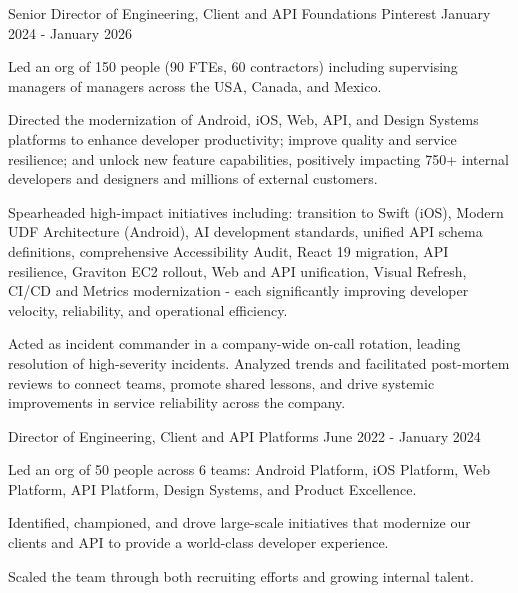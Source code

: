 \begin{cventries}
  \cventry
    {Senior Director of Engineering, Client and API Foundations} %
    {Pinterest} %
    {} %
    {January 2024 - January 2026} %
    {
	\begin{cvitems} %
	\item Led an org of 150 people (90 FTEs, 60 contractors) including supervising managers of managers across the USA, Canada, and Mexico.
	\item Directed the modernization of Android, iOS, Web, API, and Design Systems platforms to enhance developer productivity; improve quality and service resilience; and unlock new feature capabilities, positively impacting 750+ internal developers and designers and millions of external customers.
	\item Spearheaded high-impact initiatives including: transition to Swift (iOS), Modern UDF Architecture (Android), AI development standards, unified API schema definitions, comprehensive Accessibility Audit, React 19 migration, API resilience, Graviton EC2 rollout, Web and API unification, Visual Refresh, CI/CD and Metrics modernization - each significantly improving developer velocity, reliability, and operational efficiency.
	\item Acted as incident commander in a company-wide on-call rotation, leading resolution of high-severity incidents. Analyzed trends and facilitated post-mortem reviews to connect teams, promote shared lessons, and drive systemic improvements in service reliability across the company.
	\end{cvitems}
    }

  \cventry
    {Director of Engineering, Client and API Platforms} %
    {} %
    {} %
    {June 2022 - January 2024} %
    {
	\begin{cvitems} %
	\item Led an org of 50 people across 6 teams: Android Platform, iOS Platform, Web Platform, API Platform, Design Systems, and Product Excellence.
	\item Identified, championed, and drove large-scale initiatives that modernize our clients and API to provide a world-class developer experience.
	\item Scaled the team through both recruiting efforts and growing internal talent.
	\end{cvitems}
    }


\end{cventries}
